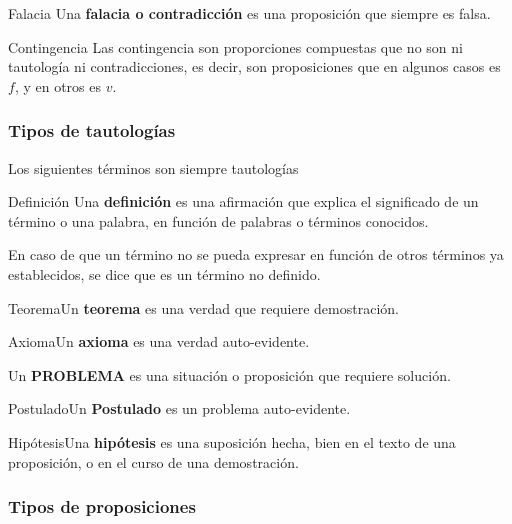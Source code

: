 \begin{ideas}{Falacia} Una \textbf{falacia o contradicción} es
una proposición que siempre es falsa. 

\end{ideas}

\begin{ideas}{Contingencia} Las contingencia son proporciones compuestas
que no son ni tautología ni contradicciones, es decir, son proposiciones
que en algunos casos es $f$, y en otros es $v$.\end{ideas} 


\subsubsection{Tipos de tautologías}

Los siguientes términos son siempre tautologías

\begin{ideas}{Definición} Una \textbf{definición} es una afirmación
que explica el significado de un término o una palabra, en función
de palabras o términos conocidos.

\end{ideas}

En caso de que un término no se pueda expresar en función de otros
términos ya establecidos, se dice que es un término no definido. 

\begin{ideas}{Teorema}Un \textbf{teorema} es una verdad que requiere
demostración. \end{ideas} 

\begin{ideas}{Axioma}Un \textbf{axioma} es una verdad auto-evidente.
\end{ideas} 

Un \textbf{PROBLEMA} es una situación o proposición que requiere solución. 

\begin{ideas}{Postulado}Un \textbf{Postulado} es un problema auto-evidente.
\end{ideas} 

\begin{ideas}{Hipótesis}Una \textbf{hipótesis} es una suposición
hecha, bien en el texto de una proposición, o en el curso de una demostración.
\end{ideas} 


\subsubsection{Tipos de proposiciones}

